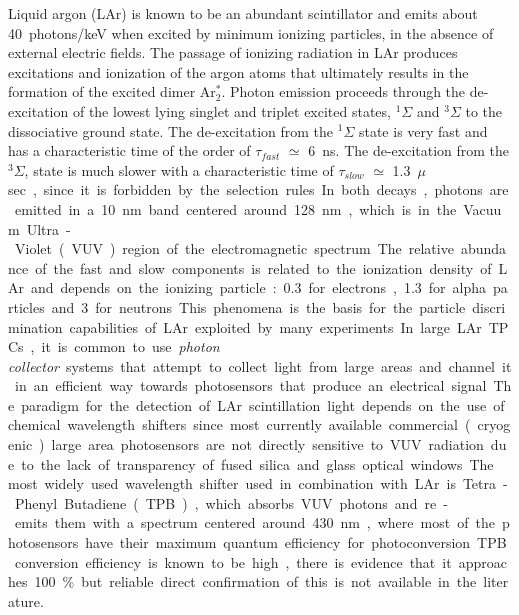 Liquid argon (LAr) is known to be an abundant scintillator and emits about \SI{40}{photons/keV} when excited  by minimum ionizing particles\cite{Doke:1990rza}, in the absence of external electric fields. The passage of ionizing radiation in LAr produces excitations and ionization of the argon atoms that ultimately results in the formation of the 
excited dimer Ar$^*_2$.  Photon emission proceeds through the de-excitation 
of the lowest lying singlet and triplet excited states, $^{1}\Sigma$ and 
$^{3}\Sigma$ to the dissociative ground state. The de-excitation from the 
$^{1}\Sigma$ state is very fast and has a characteristic time of the order of 
$\tau_{fast}$ $\simeq$ \SI{6}{ns}. The de-excitation from the $^{3}\Sigma$, state is 
much slower with a characteristic time of $\tau_{slow}$ $\simeq$ \SI{1.3}{$\mu$sec}, 
since it is forbidden by the selection rules. 
In both decays, photons are emitted in a \SI{10}{nm} band centered around \SI{128}{nm}, which is in 
the Vacuum Ultra-Violet (VUV) region of the electromagnetic spectrum.
The relative abundance of the  fast and slow components is related to the ionization density of LAr and 
depends on the ionizing particle: \num{0.3} for electrons, \num{1.3} for alpha 
particles and \num{3} for neutrons. This phenomena is the basis for the  
particle discrimination capabilities of LAr exploited by many 
experiments.

In large LAr TPCs, it is common to use {\it photon collector} systems that attempt to 
collect light from large areas and channel it in an efficient way towards  
photosensors that produce an electrical signal.
The paradigm for the detection of LAr scintillation light depends on the use of 
chemical wavelength shifters since most currently available commercial (cryogenic) large area photosensors are not 
directly sensitive to VUV radiation due to the lack of transparency of fused silica and 
glass optical windows. The most widely used wavelength shifter used in 
combination with LAr is Tetra-Phenyl Butadiene (TPB), which absorbs VUV photons 
and re-emits them with a spectrum centered around \SI{430}{nm}, where most of the 
photosensors have their maximum quantum efficiency for photoconversion. 
TPB conversion efficiency is known to be high, there is evidence that 
it approaches 100\% but reliable direct confirmation of this is not available in the literature.

